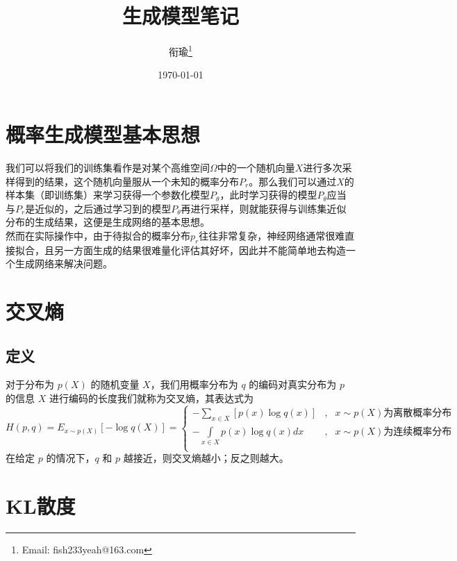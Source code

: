 \documentclass[12pt,a4paper,UTF8]{article}
\begin{document}
\title{生成模型笔记}
\author{衔瑜\thanks{Email: fish233yeah@163.com}}
\date{\today}
\maketitle

\setlength{\parindent}{2em}   %


\section{概率生成模型基本思想}
\indent 我们可以将我们的训练集看作是对某个高维空间$\Omega$中的一个随机向量$X$进行多次采样得到的结果，这个随机向量服从一个未知的概率分布$P_r$。那么我们可以通过$X$的样本集（即训练集）来学习获得一个参数化模型$P_\theta$，此时学习获得的模型$P_\theta$应当与$P_r$是近似的，之后通过学习到的模型$P_\theta$再进行采样，则就能获得与训练集近似分布的生成结果，这便是生成网络的基本思想。\\
\indent 然而在实际操作中，由于待拟合的概率分布$p_r$往往非常复杂，神经网络通常很难直接拟合，且另一方面生成的结果很难量化评估其好坏，因此并不能简单地去构造一个生成网络来解决问题。

\section{交叉熵}
\subsection{定义}
\indent 对于分布为 $p\left(X\right)$ 的随机变量 $X$，我们用概率分布为 $q$ 的编码对真实分布为 $p$ 的信息 $X$ 进行编码的长度我们就称为交叉熵，其表达式为
\[H\left(p,q\right)=E_{x\sim p\left(X\right)}\left[-\log q\left(X\right)\right]=\left\{
\begin{matrix}
-\sum\limits_{x\in X}\left[p\left(x\right)\log q\left(x\right)\right]&,&x\sim p\left(X\right)\text{为离散概率分布}\\
-\int\limits_{x\in X}p\left(x\right)\log q\left(x\right)dx&,&x\sim p\left(X\right)\text{为连续概率分布}\\
\end{matrix}
\right.\]
在给定 $p$ 的情况下，$q$ 和 $p$ 越接近，则交叉熵越小；反之则越大。

\section{KL散度}
\end{document}
